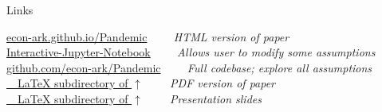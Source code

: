 \documentclass{beamer}
\begin{document}
\begin{frame}{Links}
  \begin{footnotesize}
    \parbox{\textwidth}{
      \begin{center}
        \begin{tabbing}
          \= \href{https://econ-ark.github.io/Pandemic}{econ-ark.github.io/Pandemic}     \= \textit{~~~~HTML version of paper}                                         \\
          \> \href{https://econ-ark.org/pandemicdashboard}{Interactive-Jupyter-Notebook} \> \textit{~~~~Allows user to modify some assumptions}                      \\
          \> \href{https://github.com/econ-ark/Pandemic}{github.com/econ-ark/Pandemic}   \> \textit{~~~~Full codebase; explore all assumptions} \\
          \> \href{https://github.com/econ-ark/Pandemic/blob/master/LaTeX/ConsumptionResponse.pdf}{~~LaTeX subdirectory of $\uparrow$}     \> \textit{~~~~PDF version of paper}                                         \\
          \> \href{https://github.com/econ-ark/Pandemic/blob/master/LaTeX/ConsumptionResponse-Slides.pdf}{~~LaTeX subdirectory of $\uparrow$}     \> \textit{~~~~Presentation slides}                                         \\
        \end{tabbing}
      \end{center}
    }
  \end{footnotesize}

\end{frame}
\addtocounter{framenumber}{-1}
\end{document}
